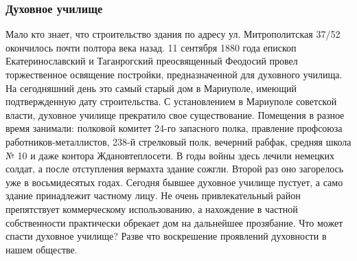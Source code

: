  
 
 
 
 

\subsubsection{Духовное училище}

Мало кто знает, что строительство здания по адресу ул. Митрополитская 37/52
окончилось почти полтора века назад. 11 сентября 1880 года епископ
Екатеринославский и Таганрогский преосвященный Феодосий провел торжественное
освящение постройки, предназначенной для духовного училища. На сегодняшний день
это самый старый дом в Мариуполе, имеющий подтвержденную дату строительства. С
установлением в Мариуполе советской власти, духовное училище прекратило свое
существование. Помещения в разное время занимали: полковой комитет 24-го
запасного полка, правление профсоюза работников-металлистов, 238-й стрелковый
полк, вечерний рабфак, средняя школа № 10 и даже контора Ждановтеплосети. В
годы войны здесь лечили немецких солдат, а после отступления вермахта здание
сожгли. Второй раз оно загорелось уже в восьмидесятых годах. Сегодня бывшее
духовное училище пустует, а само здание принадлежит частному лицу. Не очень
привлекательный район препятствует коммерческому использованию, а нахождение в
частной собственности практически обрекает дом на дальнейшее прозябание. Что
может спасти духовное училище? Разве что воскрешение проявлений духовности в
нашем обществе.



